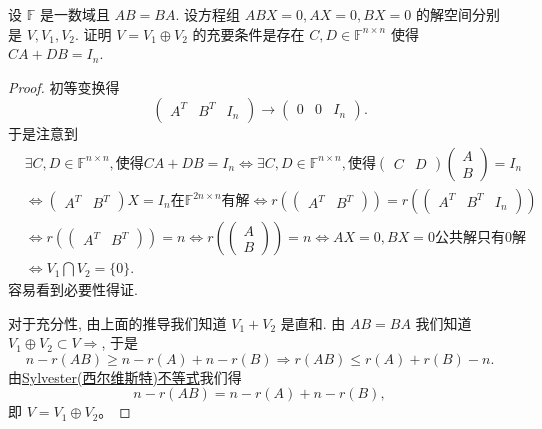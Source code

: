 \documentclass[../../main.tex]{subfiles}%
\begin{document}
\begin{example}
设 \( \mathbb{F} \) 是一数域且 \( AB = BA \). 设方程组 \( ABX = 0, AX = 0, BX = 0 \) 的解空间分别是 \( V, V_1, V_2 \). 证明 \( V = V_1 \oplus V_2 \) 的充要条件是存在 \( C, D \in \mathbb{F}^{n \times n} \) 使得 \( CA + DB = I_n \).
\end{example}
\begin{proof}

初等变换得
\[
\begin{pmatrix} A^T & B^T & I_n \end{pmatrix} \to \begin{pmatrix} 0 & 0 & I_n \end{pmatrix}.
\]
于是注意到
\[
\begin{aligned}
&\exists C, D \in \mathbb{F}^{n \times n}, \text{使得} CA + DB = I_n \iff \exists C, D \in \mathbb{F}^{n \times n}, \text{使得} \begin{pmatrix} C & D \end{pmatrix} \begin{pmatrix} A \\ B \end{pmatrix} = I_n \\
&\iff \begin{pmatrix} A^T & B^T \end{pmatrix} X = I_n \text{在} \mathbb{F}^{2n \times n} \text{有解} \iff r\left( \begin{pmatrix} A^T & B^T \end{pmatrix} \right) = r\left( \begin{pmatrix} A^T & B^T & I_n \end{pmatrix} \right) \\
&\iff r\left( \begin{pmatrix} A^T & B^T \end{pmatrix} \right) = n \iff r\left( \begin{pmatrix} A \\ B \end{pmatrix} \right) = n \iff AX = 0, BX = 0 \text{公共解只有} 0 \text{解} \\
&\iff V_1 \bigcap V_2 = \{0\}.
\end{aligned}
\]
容易看到必要性得证.

对于充分性, 由上面的推导我们知道 \( V_1 + V_2 \) 是直和. 由 \( AB = BA \) 我们知道 \( V_1 \oplus V_2 \subset V \Rightarrow \), 于是
\[
n-r(AB)\geqslant n-r(A)+n-r(B)\Rightarrow r(AB)\leqslant r(A)+r(B)-n.
\]
由\hyperref[proposition:Sylvester(西尔维斯特)不等式]{Sylvester(西尔维斯特)不等式}我们得
\[
n - r(AB) = n - r(A) + n - r(B),
\]
即 \( V = V_1 \oplus V_2 \)。

\end{proof}
\end{document}
